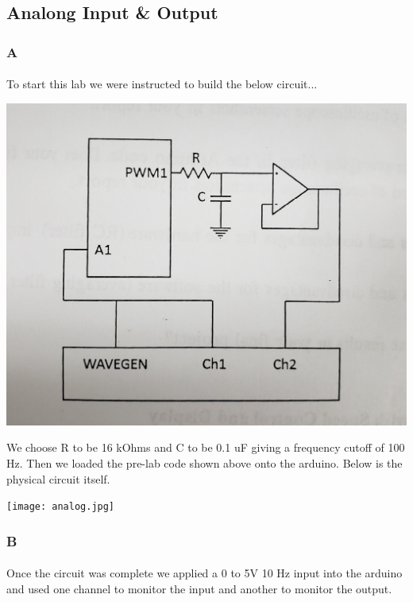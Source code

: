 \documentclass[12pt]{article}
\begin{document}
		\subsection{Analong Input \& Output}
			\subsubsection{A}
				\paragraph{}
					To start this lab we were instructed to build the below circuit...
					
					\begin{center}
						\includegraphics[scale=0.04]{4.jpg}\\
					\end{center}

					We choose R to be 16 kOhms and C to be 0.1 uF giving a frequency cutoff of 100 Hz.  Then we loaded the pre-lab code shown above
					onto the arduino.  Below is the physical circuit itself.
					
					\begin{center}
						\texttt{[image: analog.jpg]}\\
					\end{center}
			
			\subsubsection{B}
				\paragraph{}
					Once the circuit was complete we applied a 0 to 5V 10 Hz input into the arduino and used one channel to monitor the input and another to 
					monitor the output.
\end{document}
